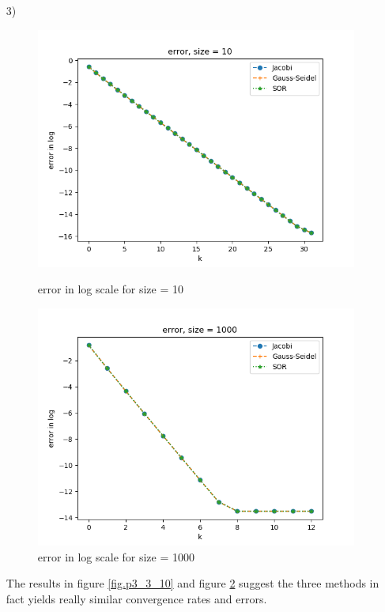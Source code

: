 \documentclass[english,onecolumn]{IEEEtran}
\begin{document}
\begin{enumerate}
\begin{figure}[htbp]
\begin{minipage}[t]{0.5\linewidth}
            \label{fig.p3_2_general}
        \end{minipage}
    \end{figure}
    It seems from figure \ref{fig.p3_2} and figure \ref{fig.p3_2_general} that, $\omega$ is best around 1 in both cases, which suggests SOR iteration is really close to Gauss-Seidel Iteration.
    \item[3)] 
    \begin{figure}[htbp]
        \begin{minipage}[t]{0.5\linewidth} 
            \centering
            \includegraphics[width=1\textwidth]{p3_3_10.png}
            \caption{error in log scale for size = 10}
            \label{fig.p3_3_10}
        \end{minipage}
        \begin{minipage}[t]{0.5\linewidth}
            \centering
            \includegraphics[width=1\textwidth]{p3_3_1000.png}
            \caption{error in log scale for size = 1000}
            \label{fig.p3_3_1000}
        \end{minipage}
    \end{figure}
    The results in figure \ref{fig.p3_3_10} and figure \ref{fig.p3_3_1000} suggest the three methods in fact yields really similar convergence rates and errors.
\end{enumerate}
\end{document}
